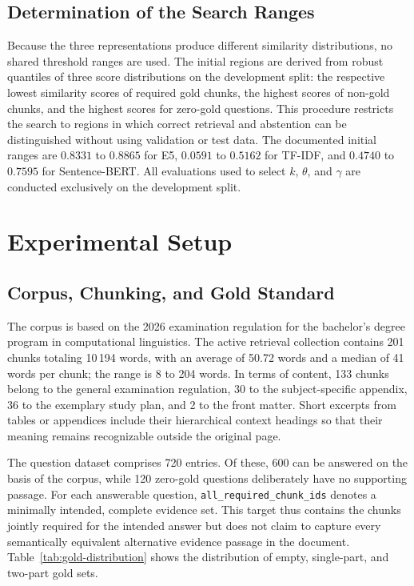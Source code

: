 \documentclass[11pt]{article}
\begin{document}
\subsection{Determination of the Search Ranges}

Because the three representations produce different similarity distributions, no shared threshold ranges are used. The initial regions are derived from robust quantiles of three score distributions on the development split: the respective lowest similarity scores of required gold chunks, the highest scores of non-gold chunks, and the highest scores for zero-gold questions. This procedure restricts the search to regions in which correct retrieval and abstention can be distinguished without using validation or test data. The documented initial ranges are $0.8331$ to $0.8865$ for E5, $0.0591$ to $0.5162$ for TF-IDF, and $0.4740$ to $0.7595$ for Sentence-BERT. All evaluations used to select $k$, $\theta$, and $\gamma$ are conducted exclusively on the development split.


\section{Experimental Setup}

\subsection{Corpus, Chunking, and Gold Standard}

The corpus is based on the 2026 examination regulation for the bachelor's degree program in computational linguistics. The active retrieval collection contains 201 chunks totaling 10{\,}194 words, with an average of 50.72 words and a median of 41 words per chunk; the range is 8 to 204 words. In terms of content, 133 chunks belong to the general examination regulation, 30 to the subject-specific appendix, 36 to the exemplary study plan, and 2 to the front matter. Short excerpts from tables or appendices include their hierarchical context headings so that their meaning remains recognizable outside the original page.

The question dataset comprises 720 entries. Of these, 600 can be answered on the basis of the corpus, while 120 zero-gold questions deliberately have no supporting passage. For each answerable question, \texttt{all\_required\_chunk\_ids} denotes a minimally intended, complete evidence set. This target thus contains the chunks jointly required for the intended answer but does not claim to capture every semantically equivalent alternative evidence passage in the document. Table~\ref{tab:gold-distribution} shows the distribution of empty, single-part, and two-part gold sets.
\end{document}
